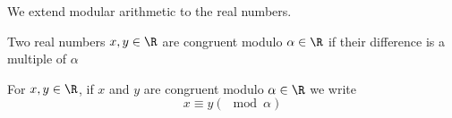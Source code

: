 


We extend modular arithmetic to the real numbers.


Two real numbers $x, y \in \R$ are congruent modulo $\alpha \in \R$ if their difference is a multiple of $\alpha$


For $x, y \in \R$, if $x$ and $y$ are congruent modulo $\alpha \in \R$ we write
\[
  x \equiv y (\mod \alpha)
\]

\blankpage
